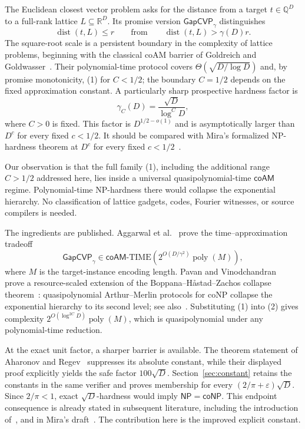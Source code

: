 \documentclass[11pt]{article}
\newcommand{\GapCVP}{\mathsf{GapCVP}}
\newcommand{\coAM}{\mathsf{coAM}}
\newcommand{\poly}{\operatorname{poly}}
\begin{document}
The Euclidean closest vector problem asks for the distance from a target
$t\in\mathbb{Q}^D$ to a full-rank lattice $L\subseteq\mathbb{R}^D$.
Its promise version $\GapCVP_\gamma$ distinguishes
\[
  \operatorname{dist}(t,L)\le r
  \qquad\text{from}\qquad
  \operatorname{dist}(t,L)>\gamma(D)r.
\]
The square-root scale is a persistent boundary in the complexity of lattice
problems, beginning with the classical coAM barrier of Goldreich and
Goldwasser~\cite{GG00}.  Their polynomial-time protocol covers
$\Theta(\sqrt{D/\log D})$ and, by promise monotonicity, (1) for
$C<1/2$; the boundary $C=1/2$ depends on the fixed approximation constant.
A particularly sharp prospective hardness factor is
\[
  \gamma_C(D)=\frac{\sqrt D}{\log^C D},                 \tag{1}
\]
where $C>0$ is fixed.  This factor is $D^{1/2-o(1)}$ and is asymptotically
larger than $D^c$ for every fixed $c<1/2$.
It should be compared with Mira's formalized NP-hardness theorem at $D^c$ for
every fixed $c<1/2$~\cite{Mira26}.

Our observation is that the full family (1), including the additional range
$C>1/2$ addressed here, lies inside a universal quasipolynomial-time $\coAM$
regime.  Polynomial-time NP-hardness there would collapse the exponential
hierarchy.  No classification of lattice gadgets, codes, Fourier witnesses,
or source compilers is needed.

The ingredients are published.  Aggarwal et al.~\cite{ABBGKLPV22} prove the
time--approximation tradeoff
\[
  \GapCVP_\gamma\in\coAM\text{-TIME}
  \left(2^{O(D/\gamma^2)}\poly(M)\right),               \tag{2}
\]
where $M$ is the target-instance encoding length.  Pavan and
Vinodchandran~\cite{PV04} prove a resource-scaled extension of the
Boppana--H\aa stad--Zachos collapse theorem~\cite{BHZ87}: quasipolynomial
Arthur--Merlin protocols for coNP collapse the exponential hierarchy to its
second level; see also~\cite{PSSV07}.  Substituting (1) into (2) gives complexity
$2^{O(\log^{2C}D)}\poly(M)$, which is quasipolynomial under any polynomial-time
reduction.

At the exact unit factor, a sharper barrier is available.  The theorem
statement of Aharonov and Regev~\cite{AR05} suppresses its absolute constant,
while their displayed proof explicitly yields the safe factor $100\sqrt D$.
Section~\ref{sec:constant} retains the constants in the same verifier and
proves membership for every $(2/\pi+\varepsilon)\sqrt D$.  Since $2/\pi<1$,
exact $\sqrt D$-hardness would imply $\mathsf{NP}=\mathsf{coNP}$.  This
endpoint consequence is already stated in subsequent literature, including
the introduction of~\cite{ABBGKLPV22}, and in Mira's draft~\cite{Mira26}.
The contribution here is the improved explicit constant.
\end{document}

